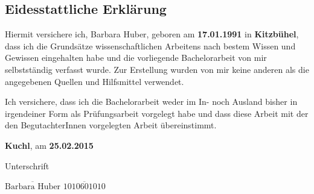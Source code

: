\subsection*{Eidesstattliche Erklärung}

Hiermit versichere ich, Barbara Huber, geboren am {\bf 17.01.1991} in {\bf Kitzbühel}, dass ich die Grundsätze wissenschaftlichen Arbeitens nach bestem Wissen und Gewissen eingehalten habe und die vorliegende Bachelorarbeit von mir selbstständig verfasst wurde. Zur Erstellung wurden von mir keine anderen als die angegebenen Quellen und Hilfsmittel verwendet. 

Ich versichere, dass ich die Bachelorarbeit weder im In- noch Ausland bisher in irgendeiner Form als Prüfungsarbeit vorgelegt habe und dass diese Arbeit mit der den BegutachterInnen vorgelegten Arbeit übereinstimmt.


\vspace*{3cm}

{\bf Kuchl}, am {\bf 25.02.2015}


\hfill


Unterschrift

\vspace*{1cm}

$\overline{\text{Barbara Huber}}$ \hfill	$\overline{\text{1010601010}}$

